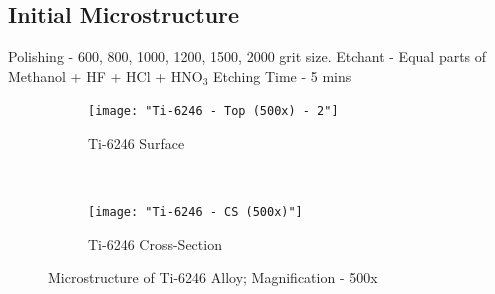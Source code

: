 \documentclass[11pt,letterpaper]{article}
\newcommand{\workingDate}{\textsc{2017 $|$ August $|$ 11}}
\begin{document}
\newpage
\renewcommand{\workingDate}{\textsc{2017 $|$ August $|$ 14}}
\subsection{Initial Microstructure}
Polishing - 600, 800, 1000, 1200, 1500, 2000 grit size.
Etchant - Equal parts of Methanol + HF + HCl + HNO$_{3}$
Etching Time - 5 mins

\begin{figure}[H]
    \centering
    \begin{subfigure}{0.49\textwidth}
        \texttt{[image: "Ti-6246 - Top (500x) - 2"]}
        \caption{Ti-6246 Surface}
        \label{fig:2a}
    \end{subfigure}
    ~
    \begin{subfigure}{0.49\textwidth}
        \texttt{[image: "Ti-6246 - CS (500x)"]}
        \caption{Ti-6246 Cross-Section}
        \label{fig:2b}
    \end{subfigure}
    \caption{Microstructure of Ti-6246 Alloy; Magnification - 500x}
    \label{fig:As-Received}
\end{figure}
\end{document}
